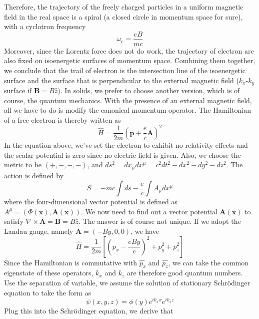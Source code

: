 \documentclass{article}
\begin{document}
Therefore, the trajectory of the freely charged particles in a uniform magnetic field in the real space is a spiral (a closed circle in momentum space for sure), with a cyclotron frequency\begin{equation}
    \omega_c=\frac{eB}{mc}
\end{equation}Moreover, since the Lorentz force does not do work, the trajectory of electron are also fixed on isoenergetic surfaces of momentum space. Combining them together, we conclude that the trail of electron is the intersection line of the isoenergetic surface and the surface that is perpendicular to the external magnetic field ($k_x$-$k_y$ surface if $\mathbf{B}=B\hat{z}$). In solids, we prefer to choose another version, which is of course, the quantum mechanics. With the presence of an external magnetic field, all we have to do is modify the canonical momentum operator. The Hamiltonian of a free electron is thereby written as\begin{equation}
    \hat{H}=\frac{1}{2m}(\mathbf{p}+\frac{e}{c}\mathbf{A})^2
\end{equation}In the equation above, we've set the electron to exhibit no relativity effects and the scalar potential is zero since no electric field is given. Also, we choose the metric to be $(+,-,-,-)$, and $ds^2=dx_\mu{dx^\mu}=c^2dt^2-dx^2-dy^2-dz^2$. The action is defined by\begin{equation}
    S=-mc\int{ds}-\frac{e}{c}\int{A_\mu}dx^\mu
\end{equation}where the four-dimensional vector potential is defined as $A^\mu=(\Phi(\mathbf{x}),\mathbf{A}(\mathbf{x}))$. We now need to find out a vector potential $\mathbf{A}(\mathbf{x})$ to satisfy $\nabla\times\mathbf{A}=\mathbf{B}=B\hat{z}$. The answer is of course not unique. If we adopt the Landau gauge, namely $\mathbf{A}=(-By,0,0)$, we have\begin{equation}
    \hat{H}=\frac{1}{2m}[(p_x-\frac{eBy}{c})^2+p_y^2+p_z^2]
\end{equation}Since the Hamiltonian is commutative with $\hat{p_x}$ and $\hat{p_z}$, we can take the common eigenstate of these operators, $k_x$ and $k_z$ are therefore good quantum numbers. Use the separation of variable, we assume the solution of stationary Schr\"odinger equation to take the form as\begin{equation}
    \psi(x,y,z)=\phi(y)e^{ik_xx}e^{ik_zz}
\end{equation}Plug this into the Schr\"odinger equation, we derive that\begin{equation}

\end{equation}
\end{document}
